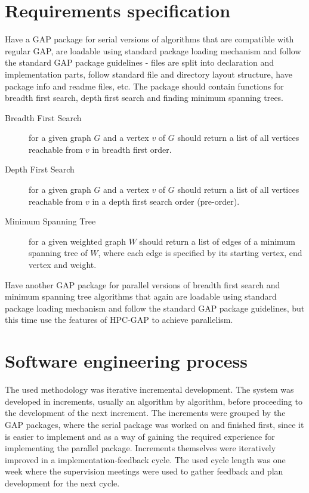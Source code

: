 \documentclass{report}
\theoremstyle{plain}
\theoremstyle{definition}
\theoremstyle{remark}
\begin{document}
\section{Requirements specification}

Have a GAP package for serial versions of algorithms that are compatible with regular GAP, are loadable using standard package loading mechanism and follow the standard GAP package guidelines - files are split into declaration and implementation parts, follow standard file and directory layout structure, have package info and readme files, etc. The package should contain functions for breadth first search, depth first search and finding minimum spanning trees.
\begin{description}
\item[Breadth First Search] for a given graph $G$ and a vertex $v$ of $G$ should return a list of all vertices reachable from $v$ in breadth first order.
\item[Depth First Search] for a given graph $G$ and a vertex $v$ of $G$ should return a list of all vertices reachable from $v$ in a depth first search order (pre-order).
\item[Minimum Spanning Tree] for a given weighted graph $W$ should return a list of edges of a minimum spanning tree of $W$, where each edge is specified by its starting vertex, end vertex and weight.
\end{description}

Have another GAP package for parallel versions of breadth first search and minimum spanning tree algorithms that again are loadable using standard package loading mechanism and follow the standard GAP package guidelines, but this time use the features of HPC-GAP to achieve parallelism.

\section{Software engineering process}
 
The used methodology was iterative incremental development. The system was developed in increments, usually an algorithm by algorithm, before proceeding to the development of the next increment. The increments were grouped by the GAP packages, where the serial package was worked on and finished first, since it is easier to implement and as a way of gaining the required experience for implementing the parallel package. Increments themselves were iteratively improved in a implementation-feedback cycle. The used cycle length was one week where the supervision meetings were used to gather feedback and plan development for the next cycle.
\end{document}
